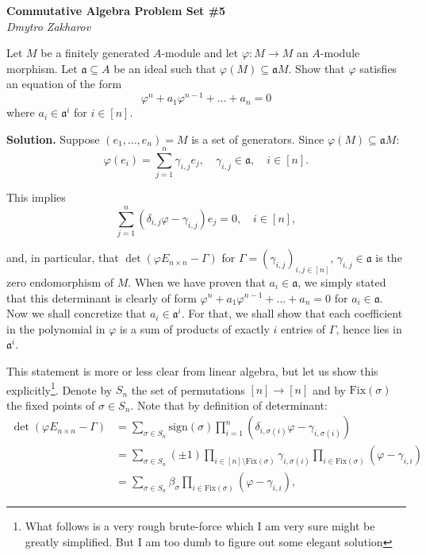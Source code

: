 \documentclass{template}
\begin{document}
\begin{center}
    \Large \textcolor{blue!70!black}{\textbf{Commutative Algebra Problem Set \#5}} \\
    \normalsize \textit{Dmytro Zakharov}
\end{center}

\begin{problem}
    Let $M$ be a finitely generated $A$-module and let $\varphi: M \to M$ an 
    $A$-module morphism. Let $\mathfrak{a} \subseteq A$ be an ideal such that 
    $\varphi(M) \subseteq \mathfrak{a} M$. Show that $\varphi$ satisfies an equation 
    of the form 
    \begin{equation*}
        \varphi^n + a_{1}\varphi^{n-1} + \dots + a_n = 0
    \end{equation*} 
    where $a_i \in \mathfrak{a}^i$ for $i \in [n]$.
\end{problem}

\textbf{Solution.} Suppose $(e_1,\dots,e_n) = M$ is a set of generators. Since
$\varphi(M) \subseteq \mathfrak{a}M$:
\begin{equation*}
    \varphi(e_i) = \sum_{j=1}^n \gamma_{i,j}e_j, \quad \gamma_{i,j} \in \mathfrak{a}, \quad i \in [n].
\end{equation*}

This implies
\begin{equation*}
    \sum_{j=1}^n (\delta_{i,j}\varphi - \gamma_{i,j})e_j = 0, \quad i \in [n],
\end{equation*}

and, in particular, that $\det(\varphi E_{n \times n} - \Gamma)$ for
$\Gamma=(\gamma_{i,j})_{i,j \in [n]}$, $\gamma_{i,j} \in \mathfrak{a}$ is the
zero endomorphism of $M$. When we have proven that $a_i \in \mathfrak{a}$, we
simply stated that this determinant is clearly of form
$\varphi^n+a_{1}\varphi^{n-1}+\dots+a_n=0$ for $a_i \in \mathfrak{a}$. Now we
shall concretize that $a_i \in \mathfrak{a}^i$. For that, we shall show that
each coefficient in the polynomial in $\varphi$ is a sum of products of exactly
$i$ entries of $\Gamma$, hence lies in $\mathfrak{a}^i$.

This statement is more or less clear from linear algebra, but let us show this
explicitly\footnote{What follows is a very rough brute-force which I am very
sure might be greatly simplified. But I am too dumb to figure out some elegant
solution}. Denote by $S_n$ the set of permutations $[n] \to [n]$ and by
$\text{Fix}(\sigma)$ the fixed points of $\sigma \in S_n$. Note that by
definition of determinant:
\begin{align*}
    \det(\varphi E_{n \times n} - \Gamma) &= \sum_{\sigma \in S_n}\text{sign}(\sigma)\prod_{i=1}^n (\delta_{i,\sigma(i)}\varphi - \gamma_{i,\sigma(i)}) \\
    &= \sum_{\sigma \in S_n} (\pm 1) \prod_{i \in [n] \setminus \text{Fix}(\sigma)} \gamma_{i,\sigma(i)} \prod_{i \in \text{Fix}(\sigma)} (\varphi - \gamma_{i,i}) \\
    &= \sum_{\sigma \in S_n} \beta_{\sigma}\prod_{i \in \text{Fix}(\sigma)} (\varphi - \gamma_{i,i}),
\end{align*}
\end{document}
